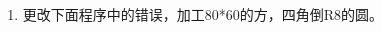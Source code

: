 \documentclass[12pt,twocolumn,landscape,UTF8,twoside]{ctexart}
\begin{document}
\begin{spacing}{1}
\begin{enumerate} [1.]
{	样例样例样例
	
	样例样例样例
	
	样例样例样例
		
	样例样例样例
	
}
\newpage
\item 更改下面程序中的错误，加工80*60的方，四角倒R8的圆。
\end{enumerate}
\label{mylastpage}
\end{spacing}
\end{document}
